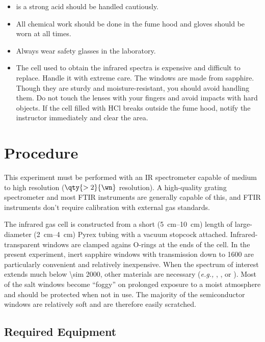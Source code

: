 \begin{itemize}
	\item {} is a strong acid should be handled cautiously. 
	\item All chemical work should be done in the fume hood and gloves should be worn at all times. 
	\item Always wear safety glasses in the laboratory.
	\item The cell used to obtain the infrared spectra is expensive and difficult to replace. 
	Handle it with extreme care. 
	The windows are made from sapphire.
	Though they are sturdy and moisture-resistant, you should avoid handling them. 
	Do not touch the lenses with your fingers and avoid impacts with hard objects. 
	If the cell filled with HCl breaks outside the fume hood, notify the instructor immediately and clear the area. 
\end{itemize}


\section{Procedure} %
\label{sec:procedure}

This experiment must be performed with an IR spectrometer capable of medium to high resolution (\( \qty{>2}{\wn} \) resolution). 
A high-quality grating spectrometer and most FTIR instruments are generally capable of this, and FTIR instruments don't require calibration with external gas standards. 

The infrared gas cell is constructed from a short (\qtyrange{5}{10}{\cm}) length of large-diameter (\qtyrange{2}{4}{\cm}) Pyrex tubing with a vacuum stopcock attached. 
Infrared-transparent windows are clamped agains O-rings at the ends of the cell. 
In the present experiment, inert sapphire windows with transmission down to \qty{1600}{\wn} are particularly convenient and relatively inexpensive. 
When the spectrum of interest extends much below \qty{\sim 2000}{\wn}, other materials are necessary (\emph{e.g.,} , , or ). 
Most of the salt windows become ``foggy'' on prolonged exposure to a moist atmosphere and should be protected when not in use. 
The majority of the semiconductor windows are relatively soft and are therefore easily scratched. 

\subsection{Required Equipment} %
\label{sub:required_equipment}

